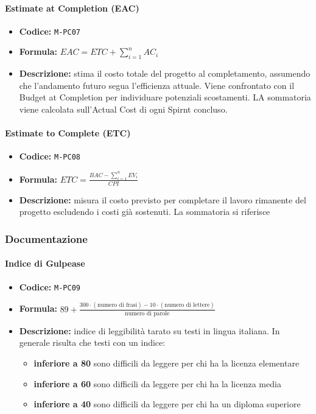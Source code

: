 \documentclass[a4paper,12pt]{article}
\begin{document}
\paragraph{Estimate at Completion (EAC)}
\begin{itemize}
    \item \textbf{Codice:} \texttt{M-PC07}
    \item \textbf{Formula:} $EAC=ETC + \displaystyle \sum_{i=1}^{n} AC_i$
    \item \textbf{Descrizione:} stima il costo totale del progetto al completamento, assumendo che 
    l’andamento futuro segua l’efficienza attuale. Viene confrontato con il Budget at Completion per individuare potenziali scostamenti. 
    LA sommatoria viene calcolata sull'Actual Cost di ogni Spirnt concluso.
\end{itemize}

\paragraph{Estimate to Complete (ETC)}
\begin{itemize}
    \item \textbf{Codice:} \texttt{M-PC08}
    \item \textbf{Formula:} $ETC=\frac{BAC - \displaystyle \sum_{i=1}^{n} EV_i}{CPI}$
    \item \textbf{Descrizione:} misura il costo previsto per completare il lavoro rimanente del progetto escludendo i costi già sostenuti. La sommatoria si riferisce 
\end{itemize}

\subsubsection{Documentazione}
\paragraph{Indice di Gulpease}
\begin{itemize}
    \item \textbf{Codice:} \texttt{M-PC09}
    \item \textbf{Formula:} $89 + \frac{300 \cdot (\text{numero di frasi}) - 10 \cdot (\text{numero di lettere})}{\text{numero di parole}}$
    \item \textbf{Descrizione:} indice di leggibilità tarato su testi in lingua italiana. In generale risulta che testi con un indice:
    \begin{itemize}
        \item \textbf{inferiore a 80} sono difficili da leggere per chi ha la licenza elementare
        \item \textbf{inferiore a 60} sono difficili da leggere per chi ha la licenza media
        \item \textbf{inferiore a 40} sono difficili da leggere per chi ha un diploma superiore
    \end{itemize}
\end{itemize}
\end{document}
